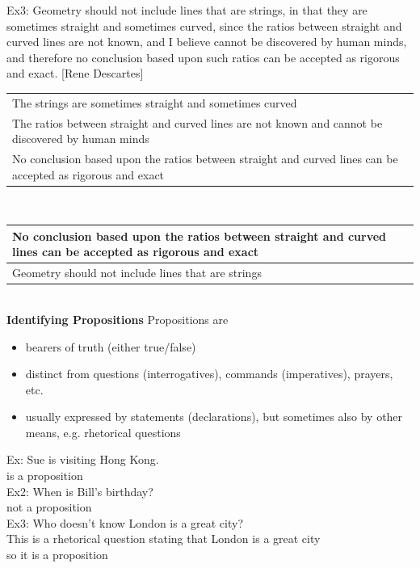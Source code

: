 \documentclass[11pt, fleqn]{article}
\begin{document}
Ex3: Geometry should not include lines that are strings, in that they are sometimes straight and sometimes curved, since the ratios between straight and curved lines are not known, and I believe cannot be discovered by human minds, and therefore no conclusion based upon such ratios can be accepted as rigorous and exact. [Rene Descartes]\\

\begin{tabular}{p{16cm}}
    The strings are sometimes straight and sometimes curved\\
    The ratios between straight and curved lines are not known and cannot be discovered by human minds\\
    \hline
    No conclusion based upon the ratios between straight and curved lines can be accepted as rigorous and exact
\end{tabular}\\

\begin{tabular}{p{16cm}}
    No conclusion based upon the ratios between straight and curved lines can be accepted as rigorous and exact\\
    \hline
    Geometry should not include lines that are strings
\end{tabular}\\

\textbf{Identifying Propositions}
Propositions are
\begin{itemize}
    \item bearers of truth (either true/false)
    \item distinct from questions (interrogatives), commands (imperatives), prayers, etc.
    \item usually expressed by statements (declarations), but sometimes also by other means, e.g. rhetorical questions
\end{itemize}
Ex: Sue is visiting Hong Kong.\\
is a proposition\\
Ex2: When is Bill's birthday?\\
not a proposition\\
Ex3: Who doesn't know London is a great city?\\
This is a rhetorical question stating that London is a great city\\
so it is a proposition\\
\end{document}

